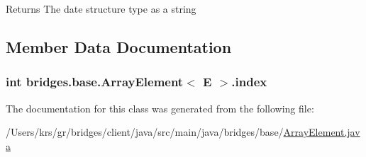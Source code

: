 \begin{DoxyReturn}{Returns}
The date structure type as a string 
\end{DoxyReturn}


\subsection{Member Data Documentation}
\hypertarget{classbridges_1_1base_1_1_array_element_a79c69e5046da8c297026d1e457a23182}{}
\subsubsection[{index}]{\setlength{\rightskip}{0pt plus 5cm}int {\bf bridges.\+base.\+Array\+Element}$<$ E $>$.index\hspace{0.3cm}{\ttfamily [static]}}\label{classbridges_1_1base_1_1_array_element_a79c69e5046da8c297026d1e457a23182}


The documentation for this class was generated from the following file\+:\begin{DoxyCompactItemize}
\item 
/\+Users/krs/gr/bridges/client/java/src/main/java/bridges/base/\hyperlink{_array_element_8java}{Array\+Element.\+java}\end{DoxyCompactItemize}
